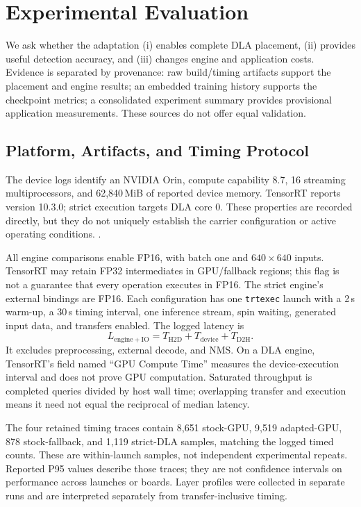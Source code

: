 \section{Experimental Evaluation}
\label{sec:eval}
We ask whether the adaptation (i) enables complete DLA placement, (ii) provides
useful detection accuracy, and (iii) changes engine and application costs.
Evidence is separated by provenance: raw build/timing artifacts support the
placement and engine results; an embedded training history supports the
checkpoint metrics; a consolidated experiment summary provides provisional
application measurements. These sources do not offer equal validation.

\subsection{Platform, Artifacts, and Timing Protocol}
\label{sec:setup}
The device logs identify an NVIDIA Orin, compute capability 8.7, 16 streaming
multiprocessors, and 62,840\,MiB of reported device memory. TensorRT reports
version 10.3.0; strict execution targets DLA core 0. These properties are
recorded directly, but they do not uniquely establish the carrier configuration
or active operating conditions.
.

All engine comparisons enable FP16, with batch one and $640\times640$ inputs.
TensorRT may retain FP32 intermediates in GPU/fallback regions; this flag is
not a guarantee that every operation executes in FP16. The strict engine's
external bindings are FP16.
Each configuration has one \texttt{trtexec} launch with a 2\,s warm-up, a 30\,s
timing interval, one inference stream, spin waiting, generated input data, and
transfers enabled. The logged latency is
\begin{equation}
 L_{\mathrm{engine+IO}} = T_{\mathrm{H2D}}+T_{\mathrm{device}}+T_{\mathrm{D2H}}.
 \label{eq:latency}
\end{equation}
It excludes preprocessing, external decode, and NMS. On a DLA engine,
TensorRT's field named ``GPU Compute Time'' measures the device-execution
interval and does not prove GPU computation. Saturated throughput is completed
queries divided by host wall time; overlapping transfer and execution means
it need not equal the reciprocal of median latency.

The four retained timing traces contain 8,651 stock-GPU, 9,519 adapted-GPU,
878 stock-fallback, and 1,119 strict-DLA samples, matching the logged timed
counts. These are within-launch samples, not independent experimental repeats.
Reported P95 values describe those traces; they are not confidence intervals
on performance across launches or boards. Layer profiles were collected in
separate runs and are interpreted separately from transfer-inclusive timing.

